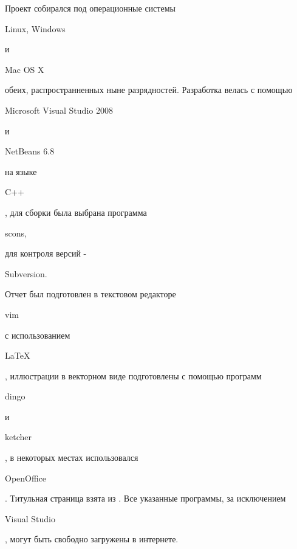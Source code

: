 Проект собирался под операционные системы \begin{tt}Linux, Windows\end{tt} и \begin{tt}Mac OS X\end{tt} обеих, распространненных ныне разрядностей.
Разработка велась с помощью \begin{tt}Microsoft Visual Studio 2008\end{tt} и \begin{tt}NetBeans 6.8\end{tt} на языке \begin{tt}C++\end{tt}, 
для сборки была выбрана программа \begin{tt}scons,\end{tt} для контроля версий - \begin{tt}Subversion.\end{tt} Отчет был подготовлен в 
текстовом редакторе \begin{tt}vim\end{tt} с использованием \begin{tt}\LaTeX\end{tt}, иллюстрации в векторном виде подготовлены с помощью программ 
\begin{tt}dingo\end{tt} и \begin{tt}ketcher\end{tt}, в некоторых местах использовался \begin{tt}OpenOffice\end{tt}. Титульная страница 
взята из \cite[стр.26]{gluhov}. Все указанные программы, за исключением \begin{tt}Visual Studio\end{tt}, могут быть свободно загружены в интернете.

